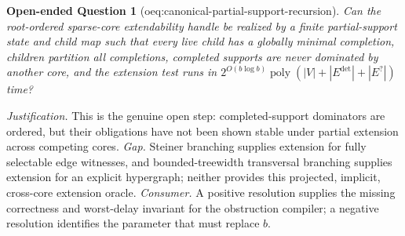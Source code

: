 \documentclass{article}
\newtheorem{openendedquestion}{Open-ended Question}
\begin{document}
\begin{openendedquestion}[oeq:canonical-partial-support-recursion]\label{oeq:canonical-partial-support-recursion}
Can the root-ordered sparse-core extendability handle be realized by a finite partial-support state and child map such that every live child has a globally minimal completion, children partition all completions, completed supports are never dominated by another core, and the extension test runs in \(2^{O(b\log b)}\operatorname{poly}(|V|+|E^{\mathrm{det}}|+|E^{?}|)\) time?
\end{openendedquestion}
\par\smallskip\noindent \textit{Justification.} This is the genuine open step: completed-support dominators are ordered, but their obligations have not been shown stable under partial extension across competing cores. \textit{Gap.} Steiner branching supplies extension for fully selectable edge witnesses, and bounded-treewidth transversal branching supplies extension for an explicit hypergraph; neither provides this projected, implicit, cross-core extension oracle. \textit{Consumer.} A positive resolution supplies the missing correctness and worst-delay invariant for the obstruction compiler; a negative resolution identifies the parameter that must replace \(b\).
\end{document}
